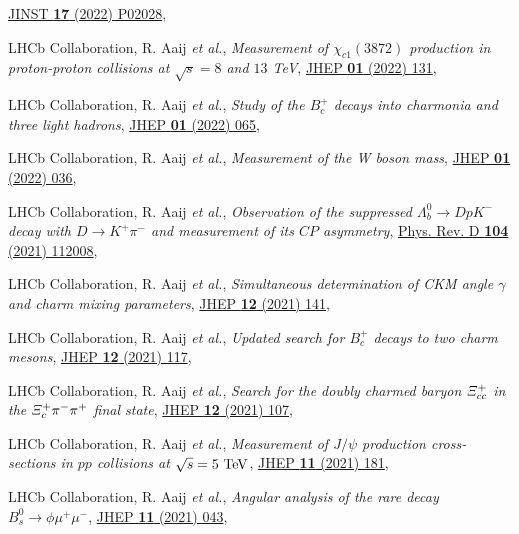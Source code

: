 \begin{cvcontent}
\begin{enumerate}[label={[\arabic*]}, leftmargin=1.5cm]
    \href{https://doi.org/10.1088/1748-0221/17/02/p02028}{JINST \textbf{17} (2022) P02028},
    \item LHCb Collaboration, R. Aaij \emph{et al.}, 
    \emph{Measurement of $\chi_{c1}(3872)$ production in proton-proton collisions at $\sqrt{s}=8$ and $13$ TeV},
    \href{https://doi.org/10.1007/JHEP01(2022)131}{JHEP \textbf{01} (2022) 131},
    \item LHCb Collaboration, R. Aaij \emph{et al.}, 
    \emph{Study of the $B_c^+$ decays into charmonia and three light hadrons},
    \href{https://doi.org/10.1007/JHEP01(2022)065}{JHEP \textbf{01} (2022) 065},
    \item LHCb Collaboration, R. Aaij \emph{et al.}, 
    \emph{Measurement of the W boson mass}, 
    \href{https://doi.org/10.1007/JHEP01(2022)036}{JHEP \textbf{01} (2022) 036},
    \item LHCb Collaboration, R. Aaij \emph{et al.}, 
    \emph{Observation of the suppressed $\Lambda_b^0\to D p K^-$ decay with $D\to K^+ \pi^-$ and measurement of its $C\!P$ asymmetry}, 
    \href{https://link.aps.org/doi/10.1103/PhysRevD.104.112008}{Phys. Rev. D \textbf{104} (2021) 112008},
    \item LHCb Collaboration, R. Aaij \emph{et al.}, 
    \emph{Simultaneous determination of CKM angle $\gamma$ and charm mixing parameters},
    \href{https://doi.org/10.1007/JHEP12(2021)141}{JHEP \textbf{12} (2021) 141},
    \sloppy
    \item LHCb Collaboration, R. Aaij \emph{et al.}, 
    \emph{Updated search for $B_c^+$ decays to two charm mesons},
    \href{https://doi.org/10.1007/JHEP12(2021)117}{JHEP \textbf{12} (2021) 117},
    \item LHCb Collaboration, R. Aaij \emph{et al.}, 
    \emph{Search for the doubly charmed baryon $\it{\Xi}_{cc}^{+}$ in the $\it{\Xi}_{c}^{+} \pi^{-} \pi^{+}$ final state},
    \href{https://doi.org/10.1007/JHEP12(2021)107}{JHEP \textbf{12} (2021) 107},
    \item LHCb Collaboration, R. Aaij \emph{et al.}, 
    \emph{Measurement of $J/\psi$ production cross-sections in $pp$ collisions at $\sqrt{s}=5~\rm{TeV}$},
    \href{http://dx.doi.org/10.1007/JHEP11(2021)181}{JHEP \textbf{11} (2021) 181},
    \sloppy
    \item LHCb Collaboration, R. Aaij \emph{et al.}, 
    \emph{Angular analysis of the rare decay $B_s^0 \to \phi \mu^+ \mu^-$},
    \href{http://dx.doi.org/10.1007/JHEP11(2021)043}{JHEP \textbf{11} (2021) 043},
  \end{enumerate}
\end{cvcontent}